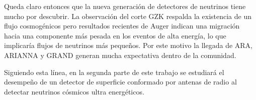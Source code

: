 	Queda claro entonces que la nueva generaci\'on de detectores de neutrinos tiene mucho por descubrir.
	La observaci\'on del corte GZK respalda la existencia de un flujo cosmog\'enicos pero resultados recientes de Auger indican una migraci\'on hacia una componente m\'as pesada en los eventos de alta energ\'ia, lo que implicar\'ia flujos de neutrinos m\'as peque\~nos.
	Por este motivo la llegada de ARA, ARIANNA y GRAND generan mucha expectativa dentro de la comunidad.
	
	Siguiendo esta l\'inea, en la segunda parte de este trabajo se estudiar\'a el desempe\~no de un detector de superficie conformado por antenas de radio al detectar neutrinos c\'osmicos ultra energ\'eticos.
	
	
	

	




